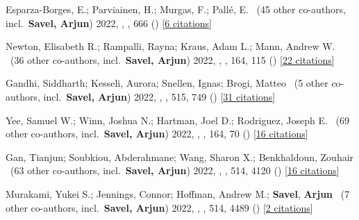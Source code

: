 \item[{\color{numcolor}\scriptsize16}] Esparza-Borges, E.; Parviainen, H.; Murgas, F.; Pall{\'e}, E. \etal\ ({45} other co-authors, incl.\ \textbf{Savel, Arjun}) 2022, , \aanda, {666} () [\href{https://ui.adsabs.harvard.edu/abs/2022A&A...666A..10E}{6 citations}]

\item[{\color{numcolor}\scriptsize15}] Newton, Elisabeth R.; Rampalli, Rayna; Kraus, Adam L.; Mann, Andrew W. \etal\ ({36} other co-authors, incl.\ \textbf{Savel, Arjun}) 2022, , \aj, {164}, 115 () [\href{https://ui.adsabs.harvard.edu/abs/2022AJ....164..115N}{22 citations}]

\item[{\color{numcolor}\scriptsize14}] Gandhi, Siddharth; Kesseli, Aurora; Snellen, Ignas; Brogi, Matteo \etal\ ({5} other co-authors, incl.\ \textbf{Savel, Arjun}) 2022, , \mnras, {515}, 749 () [\href{https://ui.adsabs.harvard.edu/abs/2022MNRAS.515..749G}{31 citations}]

\item[{\color{numcolor}\scriptsize13}] Yee, Samuel W.; Winn, Joshua N.; Hartman, Joel D.; Rodriguez, Joseph E. \etal\ ({69} other co-authors, incl.\ \textbf{Savel, Arjun}) 2022, , \aj, {164}, 70 () [\href{https://ui.adsabs.harvard.edu/abs/2022AJ....164...70Y}{16 citations}]

\item[{\color{numcolor}\scriptsize12}] Gan, Tianjun; Soubkiou, Abderahmane; Wang, Sharon X.; Benkhaldoun, Zouhair \etal\ ({63} other co-authors, incl.\ \textbf{Savel, Arjun}) 2022, , \mnras, {514}, 4120 () [\href{https://ui.adsabs.harvard.edu/abs/2022MNRAS.514.4120G}{16 citations}]

\item[{\color{numcolor}\scriptsize11}] Murakami, Yukei S.; Jennings, Connor; Hoffman, Andrew M.; \textbf{Savel}, \textbf{Arjun} \etal\ ({7} other co-authors, incl.\ \textbf{Savel, Arjun}) 2022, , \mnras, {514}, 4489 () [\href{https://ui.adsabs.harvard.edu/abs/2022MNRAS.514.4489M}{2 citations}]

